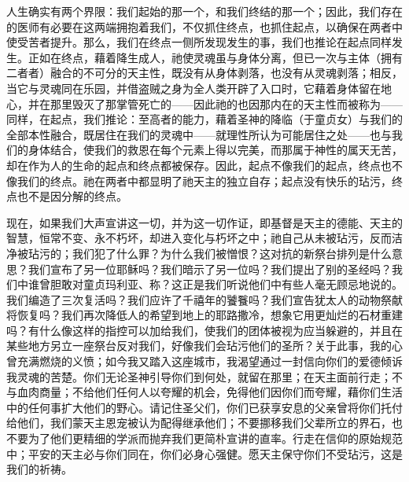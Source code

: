 人生确实有两个界限：我们起始的那一个，和我们终结的那一个；因此，我们存在的医师有必要在这两端拥抱着我们，不仅抓住终点，也抓住起点，以确保在两者中使受苦者提升。那么，我们在终点一侧所发现发生的事，我们也推论在起点同样发生。正如在终点，藉着降生成人，祂使灵魂虽与身体分离，但已一次与主体（拥有二者者）融合的不可分的天主性，既没有从身体剥落，也没有从灵魂剥落；相反，当它与灵魂同在乐园，并借盗贼之身为全人类开辟了入口时，它藉着身体留在地心，并在那里毁灭了那掌管死亡的——因此祂的也因那内在的天主性而被称为——同样，在起点，我们推论：至高者的能力，藉着圣神的降临（于童贞女）与我们的全部本性融合，既居住在我们的灵魂中——就理性所认为可能居住之处——也与我们的身体结合，使我们的救恩在每个元素上得以完美，而那属于神性的属天无苦，却在作为人的生命的起点和终点都被保存。因此，起点不像我们的起点，终点也不像我们的终点。祂在两者中都显明了祂天主的独立自存；起点没有快乐的玷污，终点也不是因分解的终点。\par

现在，如果我们大声宣讲这一切，并为这一切作证，即基督是天主的德能、天主的智慧，恒常不变、永不朽坏，却进入变化与朽坏之中；祂自己从未被玷污，反而洁净被玷污的；我们犯了什么罪？为什么我们被憎恨？这对抗的新祭台排列是什么意思？我们宣布了另一位耶稣吗？我们暗示了另一位吗？我们提出了别的圣经吗？我们中谁曾胆敢对童贞玛利亚、称？这正是我们听说他们中有些人毫无顾忌地说的。我们编造了三次复活吗？我们应许了千禧年的饕餮吗？我们宣告犹太人的动物祭献将恢复吗？我们再次降低人的希望到地上的耶路撒冷，想象它用更灿烂的石材重建吗？有什么像这样的指控可以加给我们，使我们的团体被视为应当躲避的，并且在某些地方另立一座祭台反对我们，好像我们会玷污他们的圣所？关于此事，我的心曾充满燃烧的义愤；如今我又踏入这座城市，我渴望通过一封信向你们的爱德倾诉我灵魂的苦楚。你们无论圣神引导你们到何处，就留在那里；在天主面前行走；不与血肉商量；不给他们任何人以夸耀的机会，免得他们因你们而夸耀，藉你们生活中的任何事扩大他们的野心。请记住圣父们，你们已获享安息的父亲曾将你们托付给他们，我们蒙天主恩宠被认为配得继承他们；不要挪移我们父辈所立的界石，也不要为了他们更精细的学派而抛弃我们更简朴宣讲的直率。行走在信仰的原始规范中；平安的天主必与你们同在，你们必身心强健。愿天主保守你们不受玷污，这是我们的祈祷。\par


